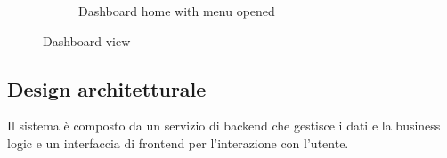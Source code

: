 \documentclass{report}
\begin{document}
\begin{figure}[H]
\begin{subfigure}{.5\textwidth}
  \caption{Dashboard home with menu opened}
  \label{fig:sub2}
\end{subfigure}
\caption{Dashboard view}
\label{fig:test}
\end{figure}


\subsection{Design architetturale}
Il sistema è composto da un servizio di backend che gestisce i dati e la business logic e un interfaccia di frontend per l'interazione con l'utente.\\
\end{document}
